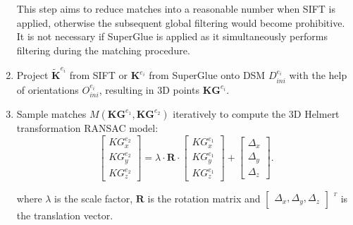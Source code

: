 \begin{enumerate}
    This step aims to reduce matches into a reasonable number when SIFT is applied, otherwise the subsequent global filtering would become prohibitive. It is not necessary if SuperGlue is applied as it simultaneously performs filtering during the matching procedure. %
    \item Project $\mathbf{\widetilde{K}}^{e_i}$ from SIFT or $\mathbf{K}^{e_i}$ from SuperGlue onto \ac{DSM} $D_{ini}^{e_i}$ with the help of orientations $O_{ini}^{e_i}$, resulting in 3D points $\mathbf{KG}^{e_i}$.
    \item Sample matches $M({\mathbf{KG}^{e_1},\mathbf{KG}^{e_2}})$ iteratively to compute the 3D Helmert transformation RANSAC model:
\begin{equation}
\left [ \begin{array}{c}
{KG}_x^{e_2}\\
{KG}_y^{e_2}\\
{KG}_z^{e_2}
\end{array}
\right ] =\lambda \cdot \mathbf{R} \cdot {\left [ \begin{array}{c}
    {KG}_x^{e_1}\\
    {KG}_y^{e_1}\\
    {KG}_z^{e_1}
    \end{array}
    \right ]} + \left [ \begin{array}{c}
\Delta_x\\
\Delta_y\\
\Delta_z
\end{array}
\right ]. \label{eq:3DSim}
\end{equation}
    
where $\lambda$ is the scale factor, $\mathbf{R}$ is the rotation matrix and $\left [ \begin{array}{c}
    \Delta_x, \Delta_y, \Delta_z
\end{array}
\right ]$ $^{^T}$ is the translation vector.
\end{enumerate}

